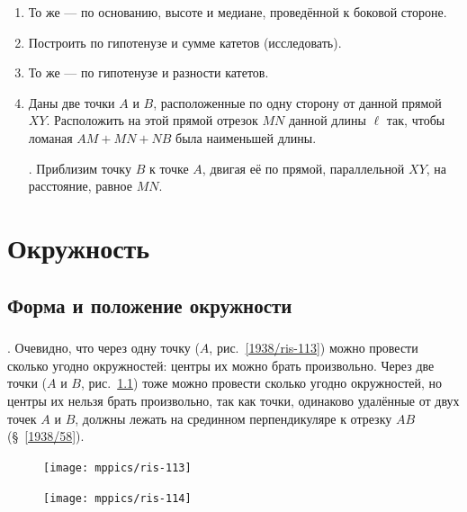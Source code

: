 \documentclass[oneside]{book}
\begin{document}
\begin{enumerate}[resume]
 \item
То же — по основанию, высоте и медиане, проведённой к боковой стороне.

 \item
Построить  по гипотенузе и сумме катетов (исследовать).

 \item
То же — по гипотенузе и разности катетов.

 \item
Даны две точки $A$ и $B$, расположенные по одну сторону от данной прямой $XY$.
Расположить на этой прямой отрезок $MN$ данной длины $\ell$ так, чтобы ломаная $AM+MN+NB$ была наименьшей длины.

\smallskip
{}.
Приблизим точку $B$ к точке $A$, двигая её по прямой, параллельной $XY$, на расстояние, равное $MN$.

\end{enumerate}

\chapter{Окружность}

\section{Форма и положение окружности}

\paragraph{}\label{1938/103}
.
Очевидно, что через одну точку ($A$, рис.~\ref{1938/ris-113}) можно провести сколько угодно окружностей:
центры их можно брать произвольно.
Через две точки ($A$ и $B$, рис.~\ref{1938/ris-114}) тоже можно провести сколько угодно окружностей, но центры их нельзя брать произвольно, так как точки, одинаково удалённые от двух точек $A$ и $B$, должны лежать на срединном перпендикуляре к отрезку $AB$ (§~\ref{1938/58}). 

\begin{figure}[h!]
\begin{minipage}{.48\textwidth}
\centering
\texttt{[image: mppics/ris-113]}
\caption{}\label{1938/ris-113}
\end{minipage}
\hfill
\begin{minipage}{.48\textwidth}
\centering
\texttt{[image: mppics/ris-114]}
\caption{}\label{1938/ris-114}
\end{minipage}
\end{figure}
\end{document}
